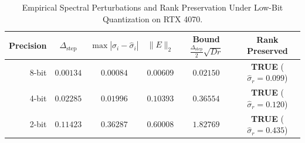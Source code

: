 \documentclass[journal]{IEEEtran}
\begin{document}
\begin{table}[h]
\centering
\caption{Empirical Spectral Perturbations and Rank Preservation Under Low-Bit Quantization on RTX 4070.}
\label{tab:quantization_noise_robustness}
\begin{tabular}{rccccc}
\toprule
\textbf{Precision} & $\Delta_{\text{step}}$ & $\max |\sigma_i - \hat{\sigma}_i|$ & $\|E\|_2$ & Bound $\frac{\Delta_{\text{step}}}{2}\sqrt{Dr}$ & \textbf{Rank Preserved} \\
\midrule
8-bit & $0.00134$ & $0.00084$ & $0.00609$ & $0.02150$ & \textbf{TRUE} ($\hat{\sigma}_r = 0.099$) \\
4-bit & $0.02285$ & $0.01996$ & $0.10393$ & $0.36554$ & \textbf{TRUE} ($\hat{\sigma}_r = 0.120$) \\
2-bit & $0.11423$ & $0.36287$ & $0.60008$ & $1.82769$ & \textbf{TRUE} ($\hat{\sigma}_r = 0.435$) \\
\bottomrule
\end{tabular}
\end{table}
\end{document}

